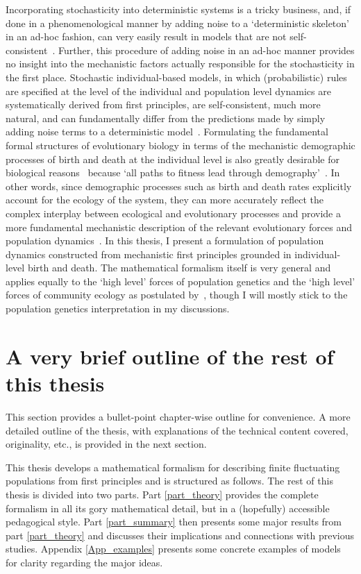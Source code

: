 Incorporating stochasticity into deterministic systems is a tricky business, and, if done in a phenomenological manner by adding noise to a `deterministic skeleton'~\citep{coulson_skeletons_2004} in an ad-hoc fashion, can very easily result in models that are not self-consistent~\citep{strang_how_2019}. Further, this procedure of adding noise in an ad-hoc manner provides no insight into the mechanistic factors actually responsible for the stochasticity in the first place. Stochastic individual-based models, in which (probabilistic) rules are specified at the level of the individual and population level dynamics are systematically derived from first principles, are self-consistent, much more natural, and can fundamentally differ from the predictions made by simply adding noise terms to a deterministic model~\citep{black_stochastic_2012,strang_how_2019}. Formulating the fundamental formal structures of evolutionary biology in terms of the mechanistic demographic processes of birth and death at the individual level is also greatly desirable for biological reasons~\citep{metcalf_why_2007,geritz_mathematical_2012} because `all paths to fitness lead through demography'~\citep{metcalf_all_2007}. In other words, since demographic processes such as birth and death rates explicitly account for the ecology of the system, they can more accurately reflect the complex interplay between ecological and evolutionary processes and provide a more fundamental mechanistic description of the relevant evolutionary forces and population dynamics~\citep{doebeli_towards_2017}. In this thesis, I present a formulation of population dynamics constructed from mechanistic first principles grounded in individual-level birth and death. The mathematical formalism itself is very general and applies equally to the `high level' forces of population genetics and the `high level' forces of community ecology as postulated by~\citet{vellend_theory_2016}, though I will mostly stick to the population genetics interpretation in my discussions.

\section{A very brief outline of the rest of this thesis}
This section provides a bullet-point chapter-wise outline for convenience. A more detailed outline of the thesis, with explanations of the technical content covered, originality, etc., is provided in the next section.

This thesis develops a mathematical formalism for describing finite fluctuating populations from first principles and is structured as follows. The rest of this thesis is divided into two parts. Part \ref{part_theory} provides the complete formalism in all its gory mathematical detail, but in a (hopefully) accessible pedagogical style. Part \ref{part_summary} then presents some major results from part \ref{part_theory} and discusses their implications and connections with previous studies. Appendix \ref{App_examples} presents some concrete examples of models for clarity regarding the major ideas.

